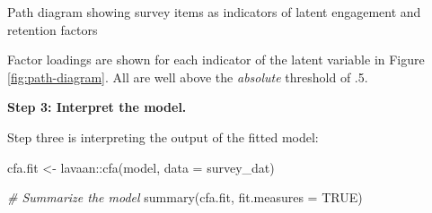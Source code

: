 \documentclass[
]{book}
\newenvironment{Shaded}{\begin{snugshade}}{\end{snugshade}}
\newcommand{\AttributeTok}[1]{\textcolor[rgb]{0.77,0.63,0.00}{#1}}
\newcommand{\CommentTok}[1]{\textcolor[rgb]{0.56,0.35,0.01}{\textit{#1}}}
\newcommand{\ConstantTok}[1]{\textcolor[rgb]{0.00,0.00,0.00}{#1}}
\newcommand{\FunctionTok}[1]{\textcolor[rgb]{0.00,0.00,0.00}{#1}}
\newcommand{\NormalTok}[1]{#1}
\newcommand{\OtherTok}[1]{\textcolor[rgb]{0.56,0.35,0.01}{#1}}
\newcommand{\SpecialCharTok}[1]{\textcolor[rgb]{0.00,0.00,0.00}{#1}}
\begin{document}
\label{fig:path-diagram}Path diagram showing survey items as indicators of latent engagement and retention factors

Factor loadings are shown for each indicator of the latent variable in Figure \ref{fig:path-diagram}. All are well above the \emph{absolute} threshold of .5.

\textbf{Step 3: Interpret the model.}

Step three is interpreting the output of the fitted model:

\begin{Shaded}
\begin{Highlighting}[]
\NormalTok{cfa.fit }\OtherTok{\textless{}{-}}\NormalTok{ lavaan}\SpecialCharTok{::}\FunctionTok{cfa}\NormalTok{(model, }\AttributeTok{data =}\NormalTok{ survey\_dat)}

\CommentTok{\# Summarize the model}
\FunctionTok{summary}\NormalTok{(cfa.fit, }\AttributeTok{fit.measures =} \ConstantTok{TRUE}\NormalTok{)}
\end{Highlighting}
\end{Shaded}
\end{document}
